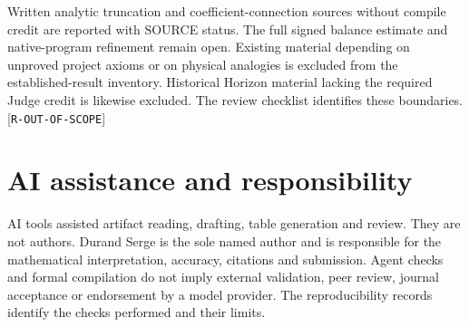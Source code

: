 \documentclass[11pt]{article}
\newcommand{\ev}[1]{{\scriptsize[\nolinkurl{#1}]}}
\theoremstyle{remark}
\begin{document}
Written analytic truncation and coefficient-connection sources without
compile credit are reported with SOURCE status. The full signed balance
estimate and native-program refinement remain open. Existing material
depending on unproved project axioms or on physical analogies is excluded
from the established-result inventory. Historical Horizon material lacking
the required Judge credit is likewise excluded. The review checklist
identifies these boundaries.\ev{R-OUT-OF-SCOPE}

\section{AI assistance and responsibility}
AI tools assisted artifact reading, drafting, table generation and review.
They are not authors. Durand Serge is the sole named author and is
responsible for the mathematical interpretation, accuracy, citations and
submission. Agent checks and formal compilation do not imply external
validation, peer review, journal acceptance or endorsement by a model
provider. The reproducibility records identify the checks performed and
their limits.



\end{document}
